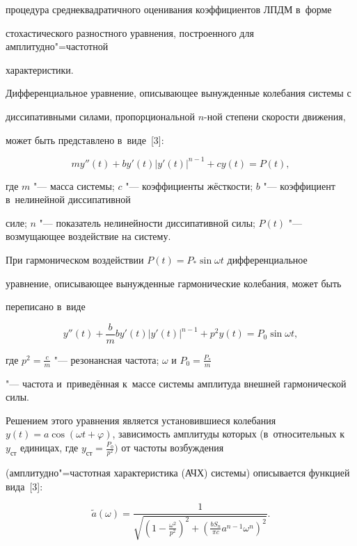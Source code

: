 процедура среднеквадратичного оценивания коэффициентов ЛПДМ в~форме 


стохастического разностного уравнения, построенного для амплитудно"=частотной 


характеристики.





Дифференциальное уравнение, описывающее вынужденные колебания системы с~


диссипативными силами, пропорциональной $n$-ной степени скорости движения, 


может быть представлено в~виде~[3]:


\[


m{y}''(t) + b{y}'(t)\left| {{y}'(t)} \right|^{n - 1} + cy(t) = P(t),


\]


где $m$ "--- масса системы; $c$ "--- коэффициенты жёсткости; $b$ "--- коэффициент в~нелинейной диссипативной 


силе; $n$ "--- показатель нелинейности диссипативной силы; $P(t)$ "--- возмущающее воздействие на систему.





При гармоническом воздействии $P(t) = P_\ast \sin \omega t$ дифференциальное 


уравнение, описывающее вынужденные гармонические колебания, может быть 


переписано в~виде


\[


{y}''(t) + \frac{b}{m}b{y}'(t)\left| {{y}'(t)} \right|^{n - 1} + p^2y(t) = 


P_0 \sin \omega t,


\]


где $p^2 = \frac{c}{m}$ "--- резонансная частота; $\omega $ и $P_0 = \frac{P_\ast }{m}$ 


"--- частота и~приведённая к~массе системы амплитуда внешней гармонической силы. 


Решением этого уравнения является установившиеся колебания \mbox{$y(t) = a\cos (\omega t + \varphi )$}, зависимость амплитуды которых (в~относительных к~$y_{\text{ст}} $ единицах, где \mbox{$y_{\text{ст}} = \frac{P_0 }{p^2})$} от частоты возбуждения 


(амплитудно"=частотная характеристика  (АЧХ) системы) описывается функцией вида~[3]:


\begin{equation}


\label{popova:eq1}


\tilde {a}(\omega ) = \frac{1}{\sqrt {\left( {1 - \frac{\omega ^2}{p^2}} 


\right)^2 + \left( {\frac{bS_n }{\pi c}a^{n - 1}\omega ^n} \right)^2} }.


\end{equation}








